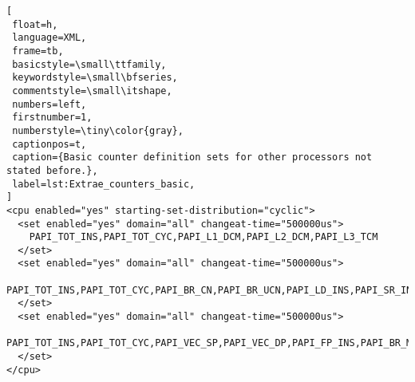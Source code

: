 \begin{lstlisting}[
 float=h,
 language=XML,
 frame=tb,
 basicstyle=\small\ttfamily,
 keywordstyle=\small\bfseries,
 commentstyle=\small\itshape,
 numbers=left,
 firstnumber=1,
 numberstyle=\tiny\color{gray},
 captionpos=t,
 caption={Basic counter definition sets for other processors not stated before.},
 label=lst:Extrae_counters_basic,
]
<cpu enabled="yes" starting-set-distribution="cyclic">
  <set enabled="yes" domain="all" changeat-time="500000us">
    PAPI_TOT_INS,PAPI_TOT_CYC,PAPI_L1_DCM,PAPI_L2_DCM,PAPI_L3_TCM
  </set>
  <set enabled="yes" domain="all" changeat-time="500000us">
    PAPI_TOT_INS,PAPI_TOT_CYC,PAPI_BR_CN,PAPI_BR_UCN,PAPI_LD_INS,PAPI_SR_INS
  </set>
  <set enabled="yes" domain="all" changeat-time="500000us">
    PAPI_TOT_INS,PAPI_TOT_CYC,PAPI_VEC_SP,PAPI_VEC_DP,PAPI_FP_INS,PAPI_BR_MSP
  </set>
</cpu>
\end{lstlisting}
